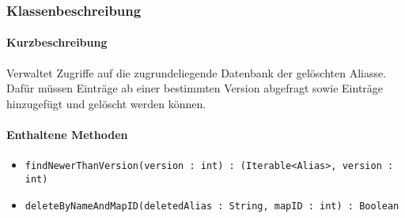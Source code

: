 \subsubsection*{Klassenbeschreibung}%
\paragraph*{Kurzbeschreibung}
Verwaltet Zugriffe auf die zugrundeliegende Datenbank der gelöschten Aliasse.
Dafür müssen Einträge ab einer bestimmten Version abgefragt sowie Einträge hinzugefügt und gelöscht werden können.
\paragraph*{Enthaltene Methoden}
\begin{itemize}
    \item \texttt{findNewerThanVersion(version : int) : (Iterable<Alias>, version : int)}
    \item \texttt{deleteByNameAndMapID(deletedAlias : String, mapID : int) : Boolean}
\end{itemize}
